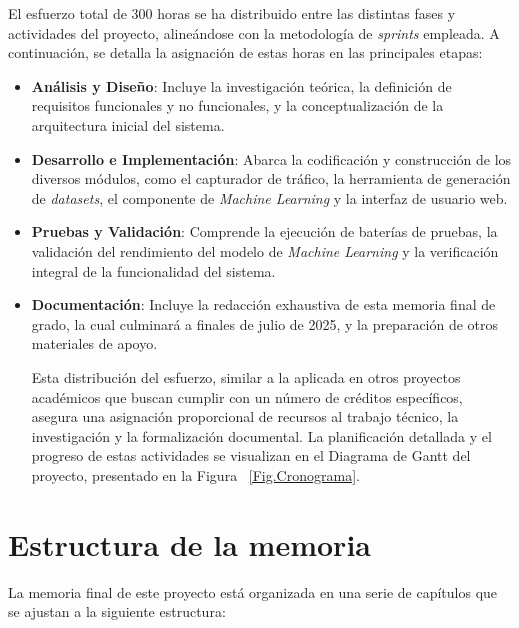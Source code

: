 El esfuerzo total de 300 horas se ha distribuido entre las distintas fases y actividades del proyecto, alineándose con la metodología de \textit{sprints} empleada. A continuación, se detalla la asignación de estas horas en las principales etapas:

\begin{itemize}

    \item\textbf{Análisis y Diseño}: Incluye la investigación teórica, la definición de requisitos funcionales y no funcionales, y la conceptualización de la arquitectura inicial del sistema.
    
    \item\textbf{Desarrollo e Implementación}: Abarca la codificación y construcción de los diversos módulos, como el capturador de tráfico, la herramienta de generación de \textit{datasets}, el componente de \textit{Machine Learning} y la interfaz de usuario web.
    
    \item\textbf{Pruebas y Validación}: Comprende la ejecución de baterías de pruebas, la validación del rendimiento del modelo de \textit{Machine Learning} y la verificación integral de la funcionalidad del sistema.
    
    \item\textbf{Documentación}: Incluye la redacción exhaustiva de esta memoria final de grado, la cual culminará a finales de julio de 2025, y la preparación de otros materiales de apoyo.
    
    Esta distribución del esfuerzo, similar a la aplicada en otros proyectos académicos que buscan cumplir con un número de créditos específicos, asegura una asignación proporcional de recursos al trabajo técnico, la investigación y la formalización documental. La planificación detallada y el progreso de estas actividades se visualizan en el Diagrama de Gantt del proyecto, presentado en la Figura ~\ref{Fig.Cronograma}.


\end{itemize}
\section{Estructura de la memoria}
La memoria final de este proyecto está organizada en una serie de capítulos que se ajustan a la siguiente estructura:

